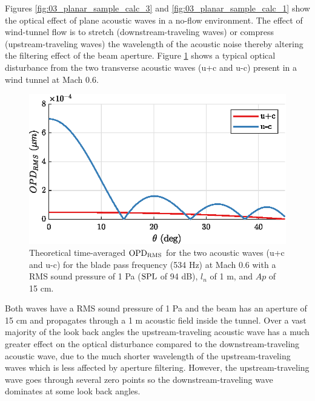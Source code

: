 Figures \ref{fig:03_planar_sample_calc_3} and \ref{fig:03_planar_sample_calc_1} show the optical effect of plane acoustic waves in a no-flow environment.
The effect of wind-tunnel flow is to stretch (downstream-traveling waves) or compress (upstream-traveling waves) the wavelength of the acoustic noise thereby altering the filtering effect of the beam aperture.
Figure \ref{fig:03_planar_sample_calc_2} shows a typical optical disturbance from the two transverse acoustic waves (u+c and u-c) present in a wind tunnel at Mach 0.6.
\begin{figure}
  \centering
  \includegraphics{../matlab/03_aero_optics_acoustics/planar_sample_calc_2.eps}
  \caption{Theoretical time-averaged $\operatorname{OPD_{RMS}}$ for the two acoustic waves (u+c and u-c) for the blade pass frequency (534 Hz) at Mach 0.6 with a RMS sound pressure of 1 Pa ($\operatorname{SPL}$ of 94 dB), $l_n$ of 1 m, and $Ap$ of 15 cm.}
  \label{fig:03_planar_sample_calc_2}
\end{figure}
Both waves have a RMS sound pressure of 1 Pa and the beam has an aperture of 15 cm and propagates through a 1 m acoustic field inside the tunnel.
Over a vast majority of the look back angles the upstream-traveling acoustic wave has a much greater effect on the optical disturbance compared to the downstream-traveling acoustic wave, due to the much shorter wavelength of the upstream-traveling waves which is less affected by aperture filtering.
However, the upstream-traveling wave goes through several zero points so the downstream-traveling wave dominates at some look back angles.


